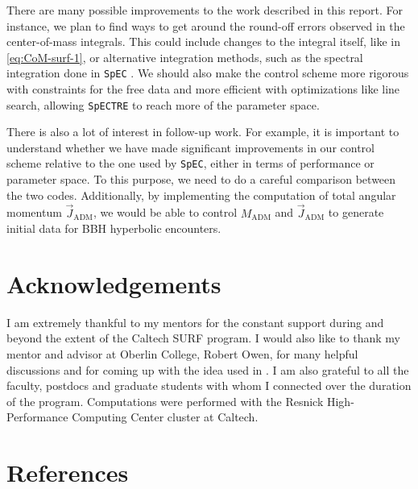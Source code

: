 \documentclass{../document}
\begin{document}
    There are many possible improvements to the work described in this report. For instance, we plan to find ways to get around the round-off errors observed in the center-of-mass integrals. This could include changes to the integral itself, like in \eq\eqref{eq:CoM-surf-1}, or alternative integration methods, such as the spectral integration done in {\tt SpEC} \cite{Serguei}. We should also make the control scheme more rigorous with constraints for the free data and more efficient with optimizations like line search, allowing {\tt SpECTRE} to reach more of the parameter space.

    There is also a lot of interest in follow-up work. For example, it is important to understand whether we have made significant improvements in our control scheme relative to the one used by {\tt SpEC}, either in terms of performance or parameter space. To this purpose, we need to do a careful comparison between the two codes. Additionally, by implementing the computation of total angular momentum $\vec J_\text{ADM}$, we would be able to control $M_\text{ADM}$ and $\vec J_\text{ADM}$ to generate initial data for BBH hyperbolic encounters.

  \section*{Acknowledgements}

    I am extremely thankful to my mentors for the constant support during and beyond the extent of the Caltech SURF program. I would also like to thank my mentor and advisor at Oberlin College, Robert Owen, for many helpful discussions and for coming up with the idea used in \eq{\eqref{eq:CoM-surf-1}}. I am also grateful to all the faculty, postdocs and graduate students with whom I connected over the duration of the program. Computations were
    performed with the Resnick High-Performance Computing Center cluster at Caltech.

  \section*{References}

	  \printbibliography[heading=none]
  
\end{document}
